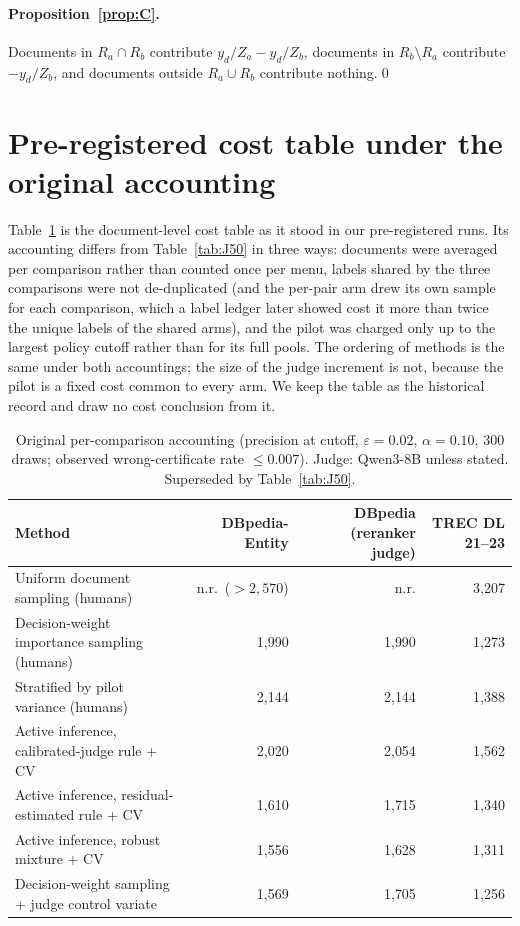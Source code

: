 \documentclass{article}
\newcommand{\eps}{\varepsilon}
\begin{document}
\paragraph{Proposition~\ref{prop:C}.} Documents in $R_a\cap R_b$ contribute $y_d/Z_a-y_d/Z_b$, documents in $R_b\setminus R_a$ contribute $-y_d/Z_b$, and documents outside $R_a\cup R_b$ contribute nothing.\qed

\section{Pre-registered cost table under the original accounting}\label{app:legacy}
Table~\ref{tab:J50legacy} is the document-level cost table as it stood in our pre-registered runs. Its accounting differs from Table~\ref{tab:J50} in three ways: documents were averaged per comparison rather than counted once per menu, labels shared by the three comparisons were not de-duplicated (and the per-pair arm drew its own sample for each comparison, which a label ledger later showed cost it more than twice the unique labels of the shared arms), and the pilot was charged only up to the largest policy cutoff rather than for its full pools. The ordering of methods is the same under both accountings; the size of the judge increment is not, because the pilot is a fixed cost common to every arm. We keep the table as the historical record and draw no cost conclusion from it.

\begin{table}[h]\centering\footnotesize
\caption{Original per-comparison accounting (precision at cutoff, $\eps=0.02$, $\alpha=0.10$, 300 draws; observed wrong-certificate rate $\le0.007$). Judge: Qwen3-8B unless stated. Superseded by Table~\ref{tab:J50}.}\label{tab:J50legacy}
\begin{tabular}{lrrr}\toprule
Method & DBpedia-Entity & DBpedia (reranker judge) & TREC DL 21--23\\\midrule
Uniform document sampling (humans) & n.r.\ ($>2{,}570$) & n.r. & 3{,}207\\
Decision-weight importance sampling (humans) & 1{,}990 & 1{,}990 & 1{,}273\\
Stratified by pilot variance (humans) & 2{,}144 & 2{,}144 & 1{,}388\\
Active inference, calibrated-judge rule + CV & 2{,}020 & 2{,}054 & 1{,}562\\
Active inference, residual-estimated rule + CV & 1{,}610 & 1{,}715 & 1{,}340\\
Active inference, robust mixture + CV & 1{,}556 & 1{,}628 & 1{,}311\\
Decision-weight sampling + judge control variate & 1{,}569 & 1{,}705 & 1{,}256\\\bottomrule
\end{tabular}
\end{table}
\end{document}
